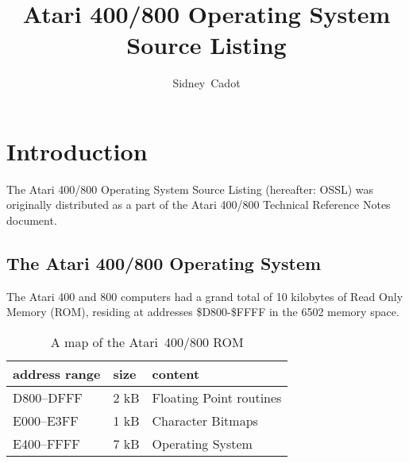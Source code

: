 \documentclass{article}
\title{Atari 400/800 Operating System Source Listing}
\author{Sidney~Cadot}
\date{}
\begin{document}
\maketitle
\section{Introduction}

The Atari 400/800 Operating System Source Listing (hereafter: OSSL) was originally distributed as a part of the Atari 400/800 Technical Reference Notes document.

\subsection{The Atari 400/800 Operating System}

The Atari 400 and 800 computers had a grand total of 10 kilobytes of Read Only Memory (ROM), residing at addresses \$D800-\$FFFF in the 6502 memory space.

\begin{table}
\begin{center}
\begin{tabular}{|l|l|l|}
\hline
address range & size & content                 \\
\hline
D800--DFFF    & 2 kB & Floating Point routines \\
E000--E3FF    & 1 kB & Character Bitmaps       \\
E400--FFFF    & 7 kB & Operating System        \\
\hline
\end{tabular}
\caption{A map of the Atari~400/800 ROM}
\end{center}
\end{table}
\end{document}
